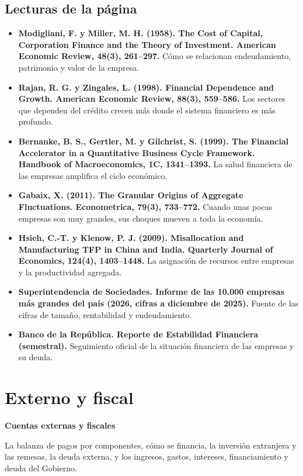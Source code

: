 \section*{Lecturas de la página}
\begin{itemize}\small
\item \textbf{Modigliani, F. y Miller, M. H. (1958). The Cost of Capital, Corporation Finance and the Theory of Investment. American Economic Review, 48(3), 261–297.} Cómo se relacionan endeudamiento, patrimonio y valor de la empresa.
\item \textbf{Rajan, R. G. y Zingales, L. (1998). Financial Dependence and Growth. American Economic Review, 88(3), 559–586.} Los sectores que dependen del crédito crecen más donde el sistema financiero es más profundo.
\item \textbf{Bernanke, B. S., Gertler, M. y Gilchrist, S. (1999). The Financial Accelerator in a Quantitative Business Cycle Framework. Handbook of Macroeconomics, 1C, 1341–1393.} La salud financiera de las empresas amplifica el ciclo económico.
\item \textbf{Gabaix, X. (2011). The Granular Origins of Aggregate Fluctuations. Econometrica, 79(3), 733–772.} Cuando unas pocas empresas son muy grandes, sus choques mueven a toda la economía.
\item \textbf{Hsieh, C.-T. y Klenow, P. J. (2009). Misallocation and Manufacturing TFP in China and India. Quarterly Journal of Economics, 124(4), 1403–1448.} La asignación de recursos entre empresas y la productividad agregada.
\item \textbf{Superintendencia de Sociedades. Informe de las 10.000 empresas más grandes del país (2026, cifras a diciembre de 2025).} Fuente de las cifras de tamaño, rentabilidad y endeudamiento.
\item \textbf{Banco de la República. Reporte de Estabilidad Financiera (semestral).} Seguimiento oficial de la situación financiera de las empresas y su deuda.
\end{itemize}

\chapter{Externo y fiscal}
\label{atlas:externo}

{\large\sffamily\bfseries Cuentas externas y fiscales\par}\medskip

La balanza de pagos por componentes, cómo se financia, la inversión extranjera y las remesas, la deuda externa, y los ingresos, gastos, intereses, financiamiento y deuda del Gobierno.

